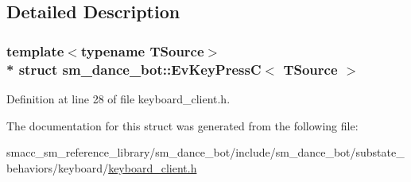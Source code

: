 \subsection{Detailed Description}
\subsubsection*{template$<$typename T\+Source$>$\\*
struct sm\+\_\+dance\+\_\+bot\+::\+Ev\+Key\+Press\+C$<$ T\+Source $>$}



Definition at line 28 of file keyboard\+\_\+client.\+h.



The documentation for this struct was generated from the following file\+:\begin{DoxyCompactItemize}
\item 
smacc\+\_\+sm\+\_\+reference\+\_\+library/sm\+\_\+dance\+\_\+bot/include/sm\+\_\+dance\+\_\+bot/substate\+\_\+behaviors/keyboard/\hyperlink{keyboard__client_8h}{keyboard\+\_\+client.\+h}\end{DoxyCompactItemize}
